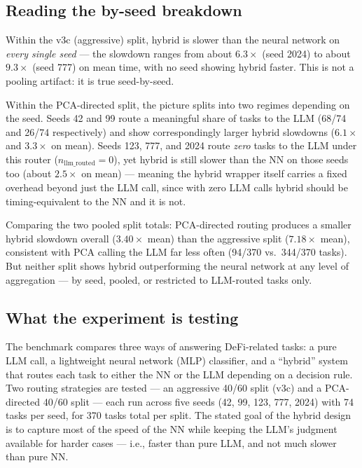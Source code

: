\documentclass[11pt]{article}
\begin{document}
\subsection{Reading the by-seed breakdown}

Within the v3c (aggressive) split, hybrid is slower than the neural
network on \emph{every single seed} --- the slowdown ranges from about
$6.3\times$ (seed 2024) to about $9.3\times$ (seed 777) on mean time, with
no seed showing hybrid faster. This is not a pooling artifact: it is true
seed-by-seed.

Within the PCA-directed split, the picture splits into two regimes
depending on the seed. Seeds 42 and 99 route a meaningful share of tasks
to the LLM (68/74 and 26/74 respectively) and show correspondingly larger
hybrid slowdowns ($6.1\times$ and $3.3\times$ on mean). Seeds 123, 777, and
2024 route \emph{zero} tasks to the LLM under this router
($n_{\text{llm\_routed}} = 0$), yet hybrid is still slower than the NN on
those seeds too (about $2.5\times$ on mean) --- meaning the hybrid wrapper
itself carries a fixed overhead beyond just the LLM call, since with zero
LLM calls hybrid should be timing-equivalent to the NN and it is not.

Comparing the two pooled split totals: PCA-directed routing produces a
smaller hybrid slowdown overall ($3.40\times$ mean) than the aggressive
split ($7.18\times$ mean), consistent with PCA calling the LLM far less
often (94/370 vs.\ 344/370 tasks). But neither split shows hybrid
outperforming the neural network at any level of aggregation --- by seed,
pooled, or restricted to LLM-routed tasks only.

\subsection{What the experiment is testing}

The benchmark compares three ways of answering DeFi-related tasks: a pure
LLM call, a lightweight neural network (MLP) classifier, and a ``hybrid''
system that routes each task to either the NN or the LLM depending on a
decision rule. Two routing strategies are tested --- an aggressive 40/60
split (v3c) and a PCA-directed 40/60 split --- each run across five seeds
(42, 99, 123, 777, 2024) with 74 tasks per seed, for 370 tasks total per
split. The stated goal of the hybrid design is to capture most of the
speed of the NN while keeping the LLM's judgment available for harder
cases --- i.e., faster than pure LLM, and not much slower than pure NN.
\end{document}
